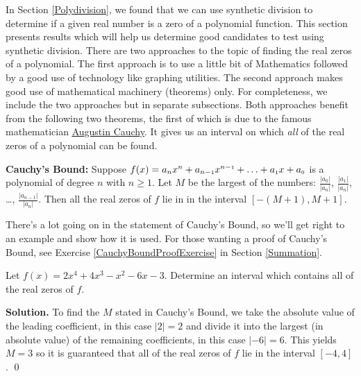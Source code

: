 

\setcounter{footnote}{0}

\label{RealZeros}

In Section \ref{Polydivision}, we found that we can use synthetic division to determine if a given real number is a zero of a polynomial function.  This section presents results which will help us determine good candidates to test using synthetic division.  There are two approaches to the topic of finding the real zeros of a polynomial.  The first approach  is to use a little bit of Mathematics followed by a good use of technology like graphing utilities.  The second approach  makes good use of mathematical machinery (theorems) only.  For completeness, we include the two approaches but in separate subsections. Both approaches benefit from the following two theorems, the first of which is due to the famous mathematician \href{http://en.wikipedia.org/wiki/Cauchy}{\underline{Augustin Cauchy}}.  It gives us an interval on which \textit{all} of the real zeros of a polynomial can be found.

\begin{tcolorbox}

\begin{thm} \label{CauchysBound}\textbf{Cauchy's Bound:}  Suppose $f(x) = a_{n} x^{n} + a_{n-\mbox{\tiny$1$}}x^{n-\mbox{\tiny$1$}} + \ldots + a_{\mbox{\tiny$1$}} x + a_{\mbox{\tiny$0$}}$ is a polynomial of degree $n$ with $n \geq 1$.  Let $M$ be the largest of the numbers: $\frac{|a_{0}|}{|a_{n}|}$, $\frac{|a_{1}|}{|a_{n}|}$, \ldots, $\frac{|a_{n-1}|}{|a_{n}|}$.  Then all the real zeros of $f$ lie in in the interval $[-(M+1),M+1]$.
\end{thm}

\end{tcolorbox}

There's a lot going on in the statement of Cauchy's Bound, so we'll get right to an example and show how it is used. For those wanting a proof of Cauchy's Bound, see Exercise \ref{CauchyBoundProofExercise} in Section \ref{Summation}.


\begin{ex} \label{CBex} Let $f(x) = 2x^4+4x^3-x^2-6x-3$.  Determine an interval which contains all of the real zeros of $f$.

{\bf Solution.} To find the $M$ stated in Cauchy's Bound, we take the absolute value of the leading coefficient, in this case $|2| = 2$ and divide it into the largest (in absolute value) of the remaining coefficients, in this case $|-6| = 6$.   This yields $M=3$ so it is guaranteed that all of the real zeros of $f$ lie in the interval $[-4,4]$.  \qed

\end{ex}

